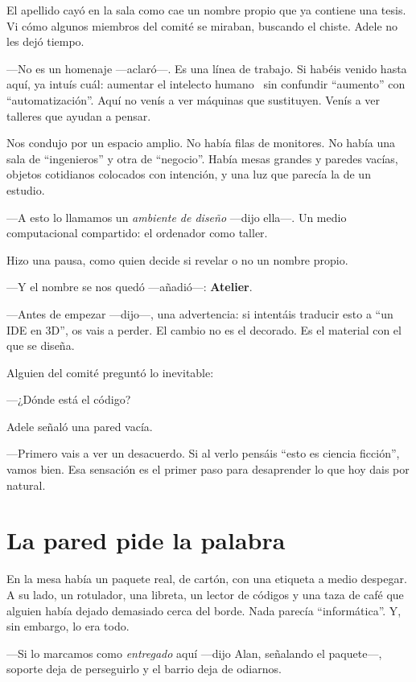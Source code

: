 \documentclass[11pt,a4paper]{article}
\begin{document}
El apellido cayó en la sala como cae un nombre propio que ya contiene una
tesis. Vi cómo algunos miembros del comité se miraban, buscando el chiste.
Adele no les dejó tiempo.

---No es un homenaje ---aclaró---. Es una línea de trabajo. Si habéis venido
hasta aquí, ya intuís cuál: aumentar el intelecto humano~\cite{engelbart} sin
confundir ``aumento'' con ``automatización''. Aquí no venís a ver máquinas que
sustituyen. Venís a ver talleres que ayudan a pensar.

Nos condujo por un espacio amplio. No había filas de monitores. No había una
sala de ``ingenieros'' y otra de ``negocio''. Había mesas grandes y paredes
vacías, objetos cotidianos colocados con intención, y una luz que parecía la
de un estudio.

---A esto lo llamamos un \emph{ambiente de diseño} ---dijo ella---. Un medio
computacional compartido: el ordenador como taller.

Hizo una pausa, como quien decide si revelar o no un nombre propio.

---Y el nombre se nos quedó ---añadió---: \textbf{Atelier}.

---Antes de empezar ---dijo---, una advertencia: si intentáis traducir esto a
``un IDE en 3D'', os vais a perder. El cambio no es el decorado. Es el
material con el que se diseña.

Alguien del comité preguntó lo inevitable:

---¿Dónde está el código?

Adele señaló una pared vacía.

---Primero vais a ver un desacuerdo. Si al verlo pensáis ``esto es ciencia
ficción'', vamos bien. Esa sensación es el primer paso para desaprender lo que
hoy dais por natural.

\section{La pared pide la palabra}

En la mesa había un paquete real, de cartón, con una etiqueta a medio
despegar. A su lado, un rotulador, una libreta, un lector de códigos y una
taza de café que alguien había dejado demasiado cerca del borde. Nada parecía
``informática''. Y, sin embargo, lo era todo.

---Si lo marcamos como \emph{entregado} aquí ---dijo Alan, señalando el
paquete---, soporte deja de perseguirlo y el barrio deja de odiarnos.
\end{document}
